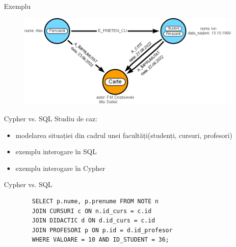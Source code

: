 \documentclass{beamer}
\begin{document}
\begin{frame}[fragile]{Exemplu}
    \begin{figure}[H]
        \centering
        \begin{adjustbox}{max size={\textwidth}{\textheight}}
        \includegraphics[scale = 0.4]{exemplu_1}
        \end{adjustbox}
    \end{figure}
\end{frame}

\begin{frame}{Cypher vs. SQL}
    Studiu de caz:
    \begin{itemize}
        \item modelarea situației din cadrul unei facultăți(studenți, cursuri, profesori)
        \item exemplu interogare în SQL
        \item exemplu interogare în Cypher
    \end{itemize}
\end{frame}


\begin{frame}[fragile]{Cypher vs. SQL}
    \centering
    \begin{BVerbatim}
        SELECT p.nume, p.prenume FROM NOTE n 
        JOIN CURSURI c ON n.id_curs = c.id
        JOIN DIDACTIC d ON d.id_curs = c.id
        JOIN PROFESORI p ON p.id = d.id_profesor
        WHERE VALOARE = 10 AND ID_STUDENT = 36;
    \end{BVerbatim}
\end{frame}
\end{document}
